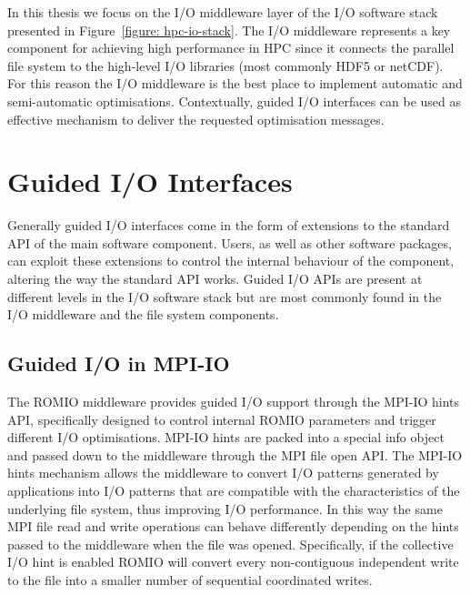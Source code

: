 In this thesis we focus on the I/O middleware layer of the I/O software stack presented in Figure~\ref{figure: hpc-io-stack}. The I/O middleware represents a key component for achieving high performance 
in HPC since it connects the parallel file system to the high-level I/O libraries (most commonly HDF5 or netCDF). For this reason the I/O middleware is the best place to implement automatic and semi-automatic 
optimisations. Contextually, guided I/O interfaces can be used as effective mechanism to deliver the requested optimisation messages.

\section{Guided I/O Interfaces} \label{sec: guided-io}
Generally guided I/O interfaces come in the form of extensions to the standard API of the main software component. Users, as well as other software packages, can exploit these extensions to control the internal 
behaviour of the component, altering the way the standard API works. Guided I/O APIs are present at different levels in the I/O software stack but are most commonly found in the I/O middleware and the file system 
components.

\subsection{Guided I/O in MPI-IO} \label{subsec: mpi-io-hints}
The ROMIO middleware provides guided I/O support through the MPI-IO hints API, specifically designed to control internal ROMIO parameters and trigger different I/O optimisations. MPI-IO hints are packed into a 
special info object and passed down to the middleware through the MPI file open API. The MPI-IO hints mechanism allows the middleware to convert I/O patterns generated by applications into I/O patterns that are 
compatible with the characteristics of the underlying file system, thus improving I/O performance. In this way the same MPI file read and write operations can behave differently depending on the hints passed to the 
middleware when the file was opened. Specifically, if the collective I/O hint is enabled ROMIO will convert every non-contiguous independent write to the file into a smaller number of sequential coordinated writes.

